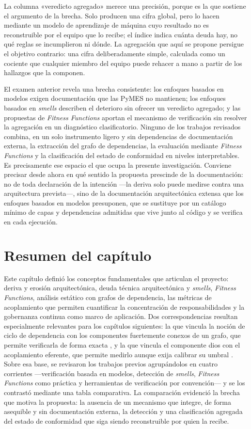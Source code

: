 La columna «veredicto agregado» merece una precisión, porque es la que sostiene el argumento de la brecha. Solo \citet{SasAvgeriou} producen una cifra global, pero lo hacen mediante un modelo de aprendizaje de máquina cuyo resultado no es reconstruible por el equipo que lo recibe; el índice indica cuánta deuda hay, no qué reglas se incumplieron ni dónde. La agregación que aquí se propone persigue el objetivo contrario: una cifra deliberadamente simple, calculada como un cociente que cualquier miembro del equipo puede rehacer a mano a partir de los hallazgos que la componen.

El examen anterior revela una brecha consistente: los enfoques basados en modelos exigen documentación que las PyMES no mantienen; los enfoques basados en \textit{smells} describen el deterioro sin ofrecer un veredicto agregado; y las propuestas de \textit{Fitness Functions} aportan el mecanismo de verificación sin resolver la agregación en un diagnóstico clasificatorio. Ninguno de los trabajos revisados combina, en un solo instrumento ligero y sin dependencias de documentación externa, la extracción del grafo de dependencias, la evaluación mediante \textit{Fitness Functions} y la clasificación del estado de conformidad en niveles interpretables. Es precisamente ese espacio el que ocupa la presente investigación. Conviene precisar desde ahora en qué sentido la propuesta prescinde de la documentación: no de toda declaración de la intención ---la deriva solo puede medirse contra una arquitectura prevista---, sino de la documentación arquitectónica extensa que los enfoques basados en modelos presuponen, que se sustituye por un catálogo mínimo de capas y dependencias admitidas que vive junto al código y se verifica en cada ejecución.

\section{Resumen del capítulo}
Este capítulo definió los conceptos fundamentales que articulan el proyecto: deriva y erosión arquitectónica, deuda técnica arquitectónica y \textit{smells}, \textit{Fitness Functions}, análisis estático con grafos de dependencia, las métricas de acoplamiento que permiten cuantificar la concentración de responsabilidades y la gobernanza continua como marco de aplicación. Dos correspondencias resultan especialmente relevantes para los capítulos siguientes: la que vincula la noción de ciclo de dependencia con los componentes fuertemente conexos de un grafo, que permite verificarla de forma exacta \citep{Tarjan1972}, y la que vincula el componente dios con el acoplamiento eferente, que permite medirlo aunque exija calibrar su umbral \citep{Martin2003}. Sobre esa base, se revisaron los trabajos previos agrupándolos en cuatro corrientes —verificación basada en modelos, detección de \textit{smells}, \textit{Fitness Functions} como práctica y herramientas de verificación por convención— y se los contrastó mediante una tabla comparativa. La comparación evidenció la brecha que motiva la propuesta: la ausencia de un mecanismo que integre, de forma asequible y sin documentación externa, la detección y una clasificación agregada del estado de conformidad que siga siendo reconstruible por quien la recibe.